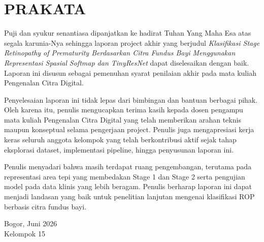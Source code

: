 
\chapter*{PRAKATA}

Puji dan syukur senantiasa dipanjatkan ke hadirat Tuhan Yang Maha Esa atas
segala karunia-Nya sehingga laporan project akhir yang berjudul
\textit{Klasifikasi Stage Retinopathy of Prematurity Berdasarkan Citra Fundus Bayi
Menggunakan Representasi Spasial Softmap dan TinyResNet}
dapat diselesaikan dengan baik. Laporan ini disusun sebagai pemenuhan syarat
penilaian akhir pada mata kuliah Pengenalan Citra Digital.

Penyelesaian laporan ini tidak lepas dari bimbingan dan bantuan berbagai pihak.
Oleh karena itu, penulis mengucapkan terima kasih kepada dosen pengampu mata
kuliah Pengenalan Citra Digital yang telah memberikan arahan teknis maupun
konseptual selama pengerjaan project. Penulis juga mengapresiasi kerja keras
seluruh anggota kelompok yang telah berkontribusi aktif sejak tahap eksplorasi
dataset, implementasi pipeline, hingga penyusunan laporan ini.

Penulis menyadari bahwa masih terdapat ruang pengembangan, terutama pada
representasi area tepi yang membedakan Stage 1 dan Stage 2 serta pengujian model
pada data klinis yang lebih beragam. Penulis berharap laporan ini dapat menjadi
landasan yang baik untuk penelitian lanjutan mengenai klasifikasi ROP berbasis
citra fundus bayi.

\vspace{1.5cm}

\begin{flushright}
Bogor, Juni 2026\\[1.5cm]
Kelompok 15
\end{flushright}
